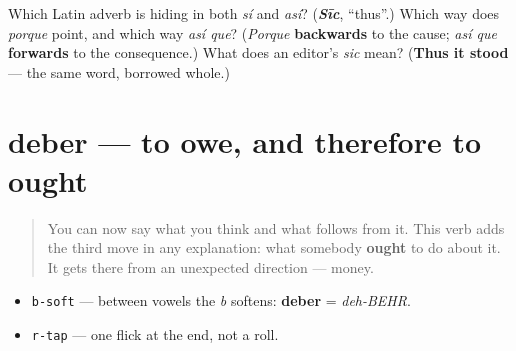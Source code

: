 \begin{tcolorbox}[breakable,colback=teal!4,colframe=teal!35!black,title={Before you move on}]
Which Latin adverb is hiding in both \emph{sí} and \emph{así}? (\emph{\textbf{Sīc}}, \textquotedblleft{}thus\textquotedblright{}.) Which way does \emph{porque} point, and which way \emph{así que}? (\emph{Porque} \textbf{backwards} to the cause; \emph{así que} \textbf{forwards} to the consequence.) What does an editor's \emph{sic} mean? (\textbf{Thus it stood} — the same word, borrowed whole.)
\end{tcolorbox}
\section[deber]{deber — to owe, and therefore to ought}

\label{lesson:ES-C39-deber}



\begin{quote}
You can now say what you think and what follows from it. This verb adds the third move in any explanation: what somebody \textbf{ought} to do about it. It gets there from an unexpected direction — money.
\end{quote}

\begin{sounds}
\begin{itemize}
\raggedright
  \item \texttt{b-soft} — between vowels the \emph{b} softens: \textbf{deber} = \emph{deh-BEHR}.
  \item \texttt{r-tap} — one flick at the end, not a roll.
\end{itemize}
\end{sounds}

